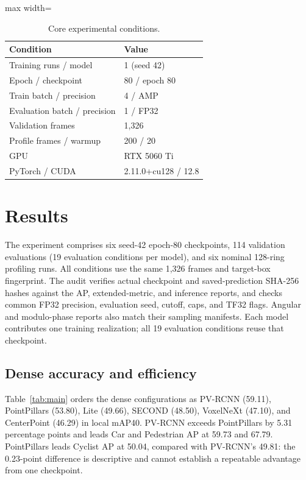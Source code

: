 \documentclass[10pt,twocolumn]{article}
\begin{document}
\begin{table}[!tbp]
\centering\small
\caption{Core experimental conditions.}
\label{tab:environment}
\begin{adjustbox}{max width=\columnwidth}\begin{tabular}{ll}
\toprule
Condition & Value\\
\midrule
Training runs / model & 1 (seed 42)\\
Epoch / checkpoint & 80 / epoch 80\\
Train batch / precision & 4 / AMP\\
Evaluation batch / precision & 1 / FP32\\
Validation frames & 1,326\\
Profile frames / warmup & 200 / 20\\
GPU & RTX 5060 Ti\\
PyTorch / CUDA & 2.11.0+cu128 / 12.8\\
\bottomrule
\end{tabular}\end{adjustbox}
\end{table}

\section{Results}
\label{sec:results}
The experiment comprises six seed-42 epoch-80 checkpoints, 114 validation evaluations (19 evaluation conditions per model), and six nominal 128-ring profiling runs. All conditions use the same 1,326 frames and target-box fingerprint. The audit verifies actual checkpoint and saved-prediction SHA-256 hashes against the AP, extended-metric, and inference reports, and checks common FP32 precision, evaluation seed, cutoff, caps, and TF32 flags. Angular and modulo-phase reports also match their sampling manifests. Each model contributes one training realization; all 19 evaluation conditions reuse that checkpoint.

\subsection{Dense accuracy and efficiency}
Table~\ref{tab:main} orders the dense configurations as PV-RCNN (59.11), PointPillars (53.80), Lite (49.66), SECOND (48.50), VoxelNeXt (47.10), and CenterPoint (46.29) in local mAP40. PV-RCNN exceeds PointPillars by 5.31 percentage points and leads Car and Pedestrian AP at 59.73 and 67.79. PointPillars leads Cyclist AP at 50.04, compared with PV-RCNN's 49.81: the 0.23-point difference is descriptive and cannot establish a repeatable advantage from one checkpoint.
\end{document}
